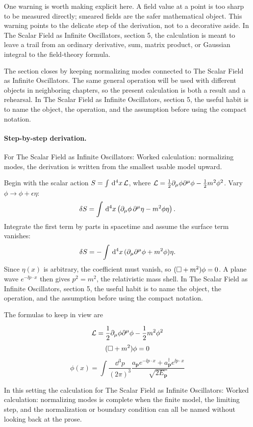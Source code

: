 One warning is worth making explicit here.  A field value at a point is too sharp to be measured directly; smeared fields are the safer mathematical object.  This warning points to the delicate step of the derivation, not to a decorative aside.  In The Scalar Field as Infinite Oscillators, section 5, the calculation is meant to leave a trail from an ordinary derivative, sum, matrix product, or Gaussian integral to the field-theory formula.

The section closes by keeping normalizing modes connected to The Scalar Field as Infinite Oscillators.  The same general operation will be used with different objects in neighboring chapters, so the present calculation is both a result and a rehearsal.  In The Scalar Field as Infinite Oscillators, section 5, the useful habit is to name the object, the operation, and the assumption before using the compact notation.



\paragraph{Step-by-step derivation.}

For The Scalar Field as Infinite Oscillators: Worked calculation: normalizing modes, the derivation is written from the smallest usable model upward.

Begin with the scalar action \(S=\int\,\mathrm d^4x\,\mathcal L\), where \(\mathcal L=\frac12\partial_\mu\phi\partial^\mu\phi-\frac12m^2\phi^2\).  Vary \(\phi\to\phi+\epsilon\eta\):
\[
  \delta S=\int\,\mathrm d^4x\left(\partial_\mu\phi\,\partial^\mu\eta-m^2\phi\eta\right).
\]
Integrate the first term by parts in spacetime and assume the surface term vanishes:
\[
  \delta S=-\int\,\mathrm d^4x\,(\partial_\mu\partial^\mu\phi+m^2\phi)\eta.
\]
Since \(\eta(x)\) is arbitrary, the coefficient must vanish, so \((\Box+m^2)\phi=0\).  A plane wave \(e^{-\ii p\cdot x}\) then gives \(p^2=m^2\), the relativistic mass shell.  In The Scalar Field as Infinite Oscillators, section 5, the useful habit is to name the object, the operation, and the assumption before using the compact notation.

The formulas to keep in view are

\[
  \mathcal L=\frac12\partial_\mu\phi\partial^\mu\phi-\frac12m^2\phi^2
\]
\[
  (\Box+m^2)\phi=0
\]
\[
  \phi(x)=\int\frac{\dd^3p}{(2\pi)^3}\frac{a_{\bm p}e^{-\ii p\cdot x}+a_{\bm p}^\dagger e^{\ii p\cdot x}}{\sqrt{2E_{\bm p}}}
\]

In this setting the calculation for The Scalar Field as Infinite Oscillators: Worked calculation: normalizing modes is complete when the finite model, the limiting step, and the normalization or boundary condition can all be named without looking back at the prose.




